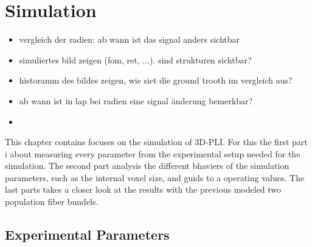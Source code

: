 \setcounter{chapter}{7}
\chapter{Simulation}
\label{cha:simulation_analysis}
% 
\begin{itemize}
\item vergleich der radien: ab wann ist das signal anders sichtbar
\item simuliertes bild zeigen (fom, ret, ...). sind strukturen sichtbar?
\item historamm des bildes zeigen, wie siet die ground trooth im vergleich aus?
\item ab wann ist in lap bei radien eine signal änderung bemerkbar?
\item 

\end{itemize}
% 
% 
% 
This chapter contains focuses on the simulation of \ac{3D-PLI}.
For this the first part i about measuring every parameter from the experimental setup needed for the simulation.
The second part analysis the different bhaviers of the simulation parameters, such as the internal voxel size, and guids to a operating values.
The last parts takes a closer look at the results with the previous modeled two population fiber bundels.
% 
\section{Experimental Parameters}
% 
% 
% 
